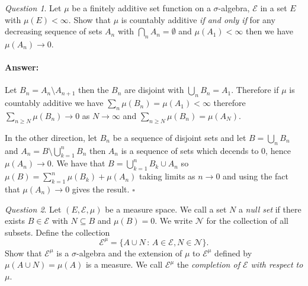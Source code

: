 \documentclass[11pt]{article}
\theoremstyle{definition}
\theoremstyle{remark}
\newtheorem{q}{Question}
\newenvironment{ans}{\paragraph{Answer:}}{\hfill$\square$}
\begin{document}
\vspace{10pt}

\begin{q}
Let $\mu$ be a finitely additive set function on a $\sigma$-algebra, $\mathcal{E}$ in a set $E$ with $\mu(E) < \infty$. Show that $\mu$ is countably additive \emph{if and only if} for any decreasing sequence of sets $A_n$ with $\bigcap_n A_n = \emptyset$ and $\mu(A_1) < \infty$ then we have $\mu(A_n) \rightarrow 0$.
\end{q}

\begin{ans}
Let $B_n = A_n \setminus A_{n+1}$ then the $B_n$ are disjoint with $\bigcup_n B_n = A_1$. Therefore if $\mu$ is countably additive we have $\sum_n \mu(B_n) = \mu(A_1)<\infty$ therefore $\sum_{n \geq N} \mu(B_n) \rightarrow 0$ as $N \rightarrow \infty$ and $\sum_{n \geq N} \mu(B_n) = \mu(A_N)$.

In the other direction, let $B_n$ be a sequence of disjoint sets and let $B = \bigcup_n B_n$ and $A_n = B \setminus \bigcup_{k=1}^n B_n$ then $A_n$ is a sequence of sets which decends to $0$, hence $\mu(A_n) \rightarrow 0$. We have that $B = \bigcup_{k=1}^n B_k \cup A_n$ so $\mu(B) = \sum_{k=1}^n \mu(B_k) + \mu(A_n)$ taking limits as $n \rightarrow 0$ and using the fact that $\mu(A_n) \rightarrow 0$ gives the result. 
\end{ans}

\vspace{10pt}

\begin{q}
Let $(E, \mathcal{E}, \mu)$ be a measure space. We call a set $N$ a \emph{null set} if there exists $B \in \mathcal{E}$ with $N \subseteq B$ and $\mu(B) = 0$. We write $\mathcal{N}$ for the collection of all subsets. Define the collection
\[ \mathcal{E}^\mu = \{ A \cup N \, :\, A \in \mathcal{E}, N \in \mathcal{N}\}. \] Show that $\mathcal{E}^\mu$ is a $\sigma$-algebra and the extension of $\mu$ to $\mathcal{E}^\mu$ defined by $\mu(A \cup N) = \mu(A)$ is a measure. We call $\mathcal{E}^\mu$ the \emph{completion of $\mathcal{E}$ with respect to $\mu$}.
\end{q}
\end{document}
